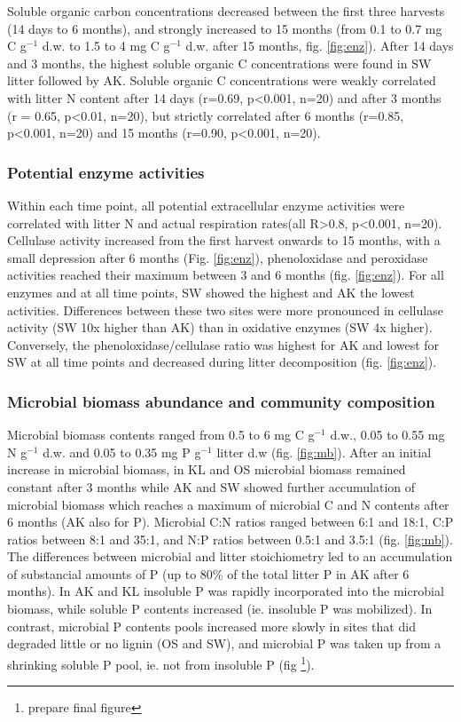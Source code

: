 Soluble organic carbon concentrations decreased between the first three harvests (14 days to 6 months), and strongly increased to 15 months (from 0.1 to 0.7 mg C g$^{-1}$  d.w. to 1.5 to 4 mg C g$^{-1}$ d.w. after 15 months, fig. \ref{fig:enz}). After 14 days and 3 months, the highest soluble organic C concentrations were found in SW litter followed by AK. Soluble organic C concentrations were weakly correlated with litter N content after 14 days (r=0.69, p\textless 0.001, n=20) and after 3 months (r = 0.65, p\textless 0.01, n=20), but strictly correlated after 6 months (r=0.85, p\textless 0.001, n=20) and 15 months (r=0.90, p\textless 0.001, n=20).

\subsubsection*{Potential enzyme activities}
Within each time point, all potential extracellular enzyme activities were correlated with litter N and actual respiration rates(all R\textgreater 0.8, p\textless 0.001, n=20). Cellulase activity increased from the first harvest onwards to 15 months, with a small depression after 6 months (Fig. \ref{fig:enz}), phenoloxidase and peroxidase activities reached their maximum between 3 and 6 months (fig. \ref{fig:enz}). For all enzymes and at all time points, SW showed the highest and AK the lowest activities. Differences between these two sites were more pronounced in cellulase activity (SW 10x higher than AK) than in oxidative enzymes (SW 4x higher). Conversely, the phenoloxidase/cellulase ratio was highest for AK and lowest for SW at all time points and decreased during litter decomposition (fig. \ref{fig:enz}).

\subsubsection*{Microbial biomass abundance and community composition}
Microbial biomass contents ranged from 0.5 to 6 mg C g$^{-1}$ d.w., 0.05 to 0.55 mg N g$^{-1}$ d.w. and 0.05 to 0.35 mg P g$^{-1}$ litter d.w (fig. \ref{fig:mb}). After an initial increase in microbial biomass, in KL and OS microbial biomass remained constant after 3 months while AK and SW showed further accumulation of microbial biomass which reaches a maximum of microbial C and N contents after 6 months (AK also for P). Microbial C:N ratios ranged between 6:1 and 18:1, C:P ratios between 8:1 and 35:1, and N:P ratios between 0.5:1 and 3.5:1 (fig. \ref{fig:mb}). The differences between microbial and litter stoichiometry led to an accumulation of substancial amounts of P (up to 80\% of the total litter P in AK after 6 months). In AK and KL insoluble P was rapidly incorporated into the microbial biomass, while soluble P contents increased (ie. insoluble P was mobilized). In contrast, microbial P contents pools increased more slowly in sites that did degraded little or no lignin (OS and SW), and microbial P was taken up from a shrinking soluble P pool, ie. not from insoluble P (fig \footnote{prepare final figure}).

